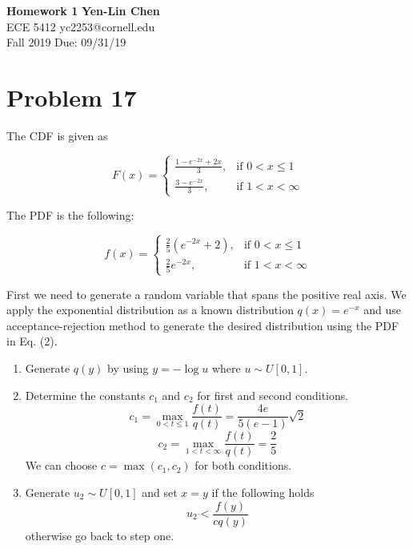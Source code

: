 \documentclass[a4paper, 11pt]{article}
\begin{document}
\noindent
\large\textbf{Homework 1} \hfill \textbf{Yen-Lin Chen} \\
\normalsize ECE 5412 \hfill yc2253@cornell.edu \\
Fall 2019 \hfill Due: 09/31/19\\





\section*{Problem 17}

The CDF is given as 

\begin{equation}
F(x)= 
\begin{cases}
    \frac{1-e^{-2x}+2x}{3},& \text{if } 0 < x \leq 1\\
    \frac{3-e^{-2x}}{3},& \text{if } 1 < x < \infty
\end{cases}
\end{equation}

The PDF is the following: 

\begin{equation}
f(x)= 
\begin{cases}
    \frac{2}{5}(e^{-2x}+2),& \text{if } 0 < x \leq 1\\
    \frac{2}{5}e^{-2x},& \text{if } 1 < x < \infty
\end{cases}
\end{equation}

First we need to generate a random variable that spans the positive real axis. We apply the exponential distribution as a known distribution $q(x) = e^{-x}$ and use acceptance-rejection method to generate the desired distribution using the PDF in Eq. (2). 
\begin{enumerate}
	\item Generate $q(y)$ by using $y = -\log{u}$ where $u \sim U[0,1]$. 
	\item Determine the constants $c_1$ and $c_2$ for first and second conditions. 
	\begin{equation}
		c_1 = \max_{0<t\leq 1} \frac{f(t)}{q(t)} = \frac{4e}{5(e-1)}\sqrt{2}
	\end{equation}
	\begin{equation}
		c_2 = \max_{1<t<\infty} \frac{f(t)}{q(t)} = \frac{2}{5}
	\end{equation}
	We can choose $c = \max(c_1, c_2)$ for both conditions. 
	\item Generate $u_2 \sim U[0,1]$ and set $x = y$ if the following holds
	\begin{equation}
		u_2 < \frac{f(y)}{cq(y)}
	\end{equation}
	otherwise go back to step one. 
\end{enumerate}
\end{document}
